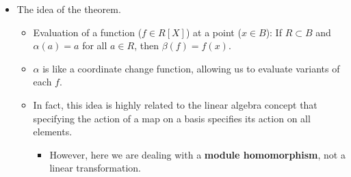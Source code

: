 \documentclass[../notes.tex]{subfiles}
\begin{document}
\begin{itemize}
\begin{proof}
        We first prove that such a ring homomorphism exists. Then we address uniqueness.\par
        Let $\beta(X)=x$. Then if $\beta$ is to be a ring homomorphism, we must have
        \begin{equation*}
            \beta(X^m) = x^m
        \end{equation*}
        for all $m\in\Zg$. We also require that $\beta(a_m)=\alpha(a_m)$ for all $a_m\in R$ (at this point, $a_m$ is just suggestive notation). Again, if $\beta$ is to be a ring homomorphism, it must follow that
        \begin{equation*}
            \beta(a_mX^m) = \beta(a_m)\beta(X^m)
            = \alpha(a_m)x^m
        \end{equation*}
        for all $a_m\in R$, $m\in\Z$. Lastly, if $\beta$ is to be a ring homomorphism, it must follow that
        \begin{equation*}
            \beta\left( \sum_{i=0}^ma_iX^i \right) = \sum_{i=0}^m\beta(a_iX^i)
            = \sum_{i=0}^m\alpha(a_i)x^i
        \end{equation*}
        But then by its construction, $\beta$ is defined on every element in $R[X]$ and is a ring homomorphism satisfying the desired properties.\par
        Suppose $\beta,\beta':R[X]\to B$ are ring homomorphisms satisfing $\beta(a)=\beta'(a)=\alpha(a)$ for all $a\in R$ and $\beta(X)=\beta'(X)=x$. Let $\sum_{i=0}^ma_iX^i\in R[X]$ be arbitrary. Then
        \begin{equation*}
            \beta\left( \sum_{i=0}^ma_iX^i \right) = \sum_{i=0}^m\alpha(a_i)x^i
            = \beta'\left( \sum_{i=0}^ma_iX^i \right)
        \end{equation*}
        as desired.
    \end{proof}
    \item The idea of the theorem.
    \begin{itemize}
        \item Evaluation of a function ($f\in R[X]$) at a point ($x\in B$): If $R\subset B$ and $\alpha(a)=a$ for all $a\in R$, then $\beta(f)=f(x)$.
        \item $\alpha$ is like a coordinate change function, allowing us to evaluate variants of each $f$.
        \item In fact, this idea is highly related to the linear algebra concept that specifying the action of a map on a basis specifies its action on all elements.
        \begin{itemize}
            \item However, here we are dealing with a \textbf{module homomorphism}, not a linear transformation.
        \end{itemize}
    \end{itemize}
\end{itemize}
\end{document}
